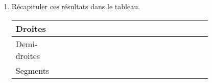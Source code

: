 \documentclass[11pt]{article}
\begin{document}
\begin{exercicedevoir}[10]
\begin{enumerate}
\begin{center}
\end{center}

\item Récapituler ces résultats dans le tableau.
\begin{center}
\renewcommand{\arraystretch}{1.8}
\begin{tabular}{|p{0.2\linewidth}|p{0.6\linewidth}|}
\hline
Droites &  \\
\hline
Demi-droites &  \\
\hline
Segments &  \\
\hline
\end{tabular}
\end{center}

\end{enumerate}
\end{exercicedevoir}
%
%
%
%
%
\end{document}
